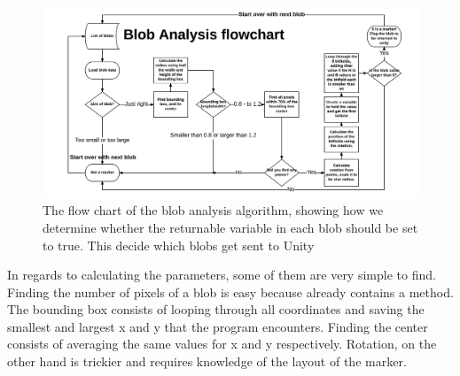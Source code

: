 \begin{figure}[H]
	\centering
	\includegraphics[width=1\linewidth]{figure/Analysis/flowchart.png}
	\caption{The flow chart of the blob analysis algorithm, showing how we determine whether the returnable variable in each blob should be set to true. This decide which blobs get sent to Unity}
	\label{fig:flow}
\end{figure} 
In regards to calculating the parameters, some of them are very simple to find. Finding the number of pixels of a blob is easy because  already contains a  method. The bounding box consists of looping through all coordinates and saving the smallest and largest x and y that the program encounters. Finding the center consists of averaging the same values for x and y respectively. Rotation, on the other hand is trickier and requires knowledge of the layout of the marker.
  
